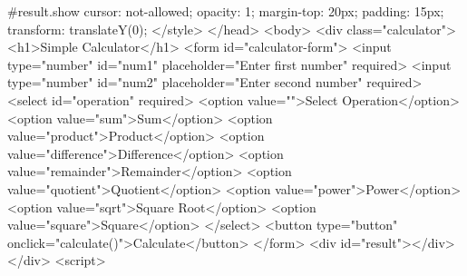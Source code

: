         #result.show {
            cursor: not-allowed;
            opacity: 1;
            margin-top: 20px;
            padding: 15px;
            transform: translateY(0);
        }
    </style>
</head>
<body>
    <div class="calculator">
        <h1>Simple Calculator</h1>
        <form id="calculator-form">
            <input type="number" id="num1" placeholder="Enter first number" required>
            <input type="number" id="num2" placeholder="Enter second number" required>
            <select id="operation" required>
                <option value="">Select Operation</option>
                <option value="sum">Sum</option>
                <option value="product">Product</option>
                <option value="difference">Difference</option>
                <option value="remainder">Remainder</option>
                <option value="quotient">Quotient</option>
                <option value="power">Power</option>
                <option value="sqrt">Square Root</option>
                <option value="square">Square</option>
            </select>
            <button type="button" onclick="calculate()">Calculate</button>
        </form>
        <div id="result"></div>
    </div>
    <script>

